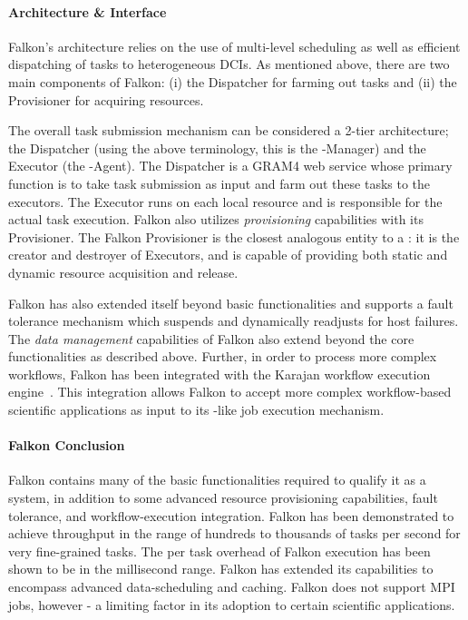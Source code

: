 \documentclass{sig-alternate}
\begin{document}
\paragraph{Architecture \& Interface}

Falkon's architecture relies on the use of multi-level scheduling
as well as efficient dispatching of tasks to heterogeneous DCIs.
As mentioned above, there are two main components of Falkon:
(i) the Dispatcher for farming out tasks and
(ii) the Provisioner for acquiring resources.

The overall task submission mechanism can be considered
a 2-tier architecture; the Dispatcher (using the above terminology,
this is the \pilot-Manager) and the Executor (the \pilot-Agent).
The Dispatcher is a GRAM4 web service whose primary
function is to take task submission as input and farm
out these tasks to the executors. The Executor runs on
each local resource and is responsible for the actual
task execution. Falkon also utilizes \textit{provisioning}
capabilities with its Provisioner. The Falkon Provisioner is the
closest analogous entity to a \pilot: it is the creator and
destroyer of Executors, and is capable of
providing both static and dynamic resource
acquisition and release.

Falkon has also extended itself beyond basic \pilotjob functionalities
and supports a fault tolerance mechanism which suspends and
dynamically readjusts for host failures. The \textit{data management}
capabilities of Falkon also extend beyond the core \pilotjob
functionalities as described above. Further, in order
to process more complex workflows, Falkon has been integrated
with the Karajan workflow execution engine~\cite{karajan}. This
integration allows Falkon to accept more complex workflow-based
scientific applications as input to its \pilot-like job execution
mechanism.

\paragraph{Falkon Conclusion}
Falkon contains many of the basic functionalities required to
qualify it as a \pilotjob system, in addition to some advanced resource
provisioning capabilities, fault tolerance, and workflow-execution integration.
Falkon has been demonstrated to achieve throughput in the range
of hundreds to thousands of tasks per second for very fine-grained
tasks. The per task overhead of Falkon execution has been shown
to be in the millisecond range. Falkon has extended its capabilities
to encompass advanced data-scheduling and caching. Falkon does
not support MPI jobs, however - a limiting factor in its adoption to
certain scientific applications.
\end{document}
